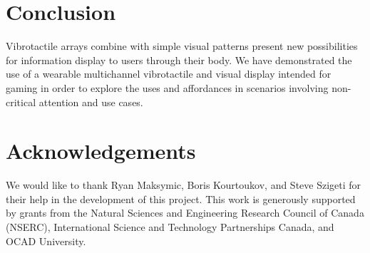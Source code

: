 \documentclass{chi-ext}
\begin{document}

\section{Conclusion}
Vibrotactile arrays combine with simple visual patterns present new possibilities for information display to users through their body. We have demonstrated the use of a wearable multichannel vibrotactile and visual display intended for gaming in order to explore the uses and affordances in scenarios involving non-critical attention and use cases. 

\section{Acknowledgements}

We would like to thank Ryan Maksymic, Boris Kourtoukov, and Steve Szigeti for their help in the development of this project. This work is generously supported by grants from the Natural Sciences and Engineering Research Council of Canada (NSERC), International Science and Technology Partnerships Canada, and OCAD University.

\balance


\end{document}
